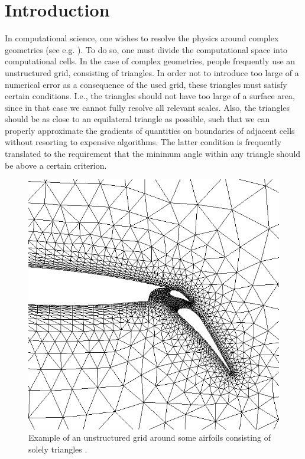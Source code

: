 \section{Introduction}
\label{sec:introduction}
In computational science, one wishes to resolve the physics around complex geometries (see e.g. ).
To do so, one must divide the computational space into computational cells.
In the case of complex geometries, people frequently use an unstructured grid, consisting of triangles.
In order not to introduce too large of a numerical error as a consequence of the used grid, these triangles
must satisfy certain conditions.
I.e., the triangles should not have too large of a surface area,
since in that case we cannot fully resolve all relevant scales.
Also, the triangles should be as close to an equilateral triangle as possible, such that we can
properly approximate the gradients of quantities on boundaries of adjacent cells without resorting to expensive algorithms.
The latter condition is frequently translated to the requirement that the minimum angle
within any triangle should be above a certain criterion.


\begin{figure}
    \centering
    \includegraphics[width=\columnwidth]{../images/airfoil.png}
    \caption{Example of an unstructured grid around some airfoils consisting of solely triangles \cite{img:airfoilImage}.}
    \label{fig:introAirfoil}
\end{figure}

